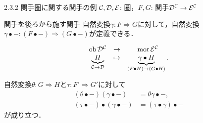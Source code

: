 \documentclass[uplatex,a4paper,dvipdfmx,aspectratio=169,10pt]{beamer}
\begin{document}
\begin{frame}[fragile]{2.3.2 関手圏に関する関手の例}
    $\mathcal{C}, \mathcal{D}, \mathcal{E}$: 圏，$F, G$: 関手$\mathcal{D}^{\mathcal{C}} \to \mathcal{E}^{\mathcal{C}}$
    \begin{exampleblock}{ 関手を後ろから施す関手}
        自然変換$\gamma \colon F \Rightarrow G$に対して，自然変換$\gamma \bullet - \colon (F \bullet -) \Rightarrow (G \bullet -)$が定義できる．
        \begin{description}[対象への作用:]
            \item[対象への作用:]
                \begin{equation*}
                    \begin{array}{ccc}
                        \operatorname{{\mathrm{ob}}} \mathcal{D}^{\mathcal{C}} & \to & \operatorname{{\mathrm{mor}}} \mathcal{E}^{\mathcal{C}}  \\
                        \underbrace{H}_{\mathcal{C} \to \mathcal{D}} & \mapsto & \underbrace{\gamma \bullet H}_{(F \bullet H) \to (G \bullet H)}.
                    \end{array}
                \end{equation*}
        \end{description}
    \end{exampleblock}
    自然変換$\theta \colon G \Rightarrow H$と$\tau \colon F' \Rightarrow G'$に対して
    \begin{equation*}
        \begin{aligned}
            (\theta \bullet -) (\gamma \bullet -) &= \theta\gamma \bullet -, \\
            (\tau \bullet -) \bullet (\gamma \bullet -) &= (\tau \bullet \gamma) \bullet -
        \end{aligned}
        \tag{2.29}
    \end{equation*}
    が成り立つ．
\end{frame}
\end{document}
